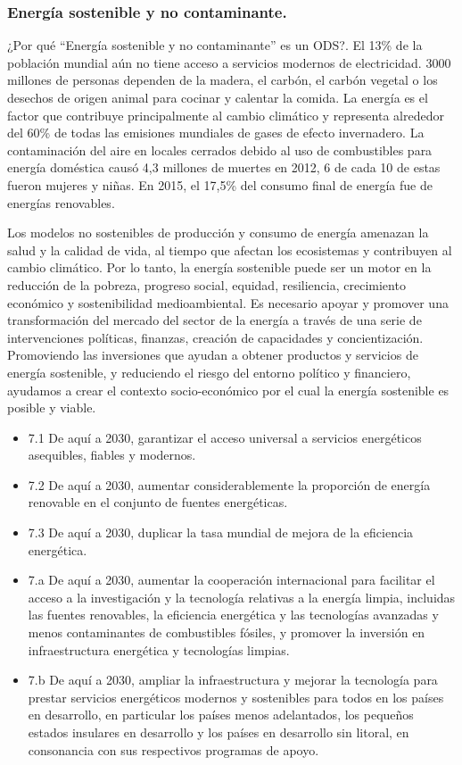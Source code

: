\subsubsection{Energía sostenible y no contaminante.}
¿Por qué ``Energía sostenible y no contaminante'' es un ODS?. El 13\% de la población mundial aún no tiene acceso a servicios modernos de electricidad. 3000 millones de personas dependen de la madera, el carbón, el carbón vegetal o los desechos de origen animal para cocinar y calentar la comida. La energía es el factor que contribuye principalmente al cambio climático y representa alrededor del 60\% de todas las emisiones mundiales de gases de efecto invernadero. La contaminación del aire en locales cerrados debido al uso de combustibles para energía doméstica causó 4,3 millones de muertes en 2012, 6 de cada 10 de estas fueron mujeres y niñas. En 2015, el 17,5\% del consumo final de energía fue de energías renovables.

Los modelos no sostenibles de producción y consumo de energía amenazan la salud y la calidad de vida, al tiempo que afectan los ecosistemas y contribuyen al cambio climático. Por lo tanto, la energía sostenible puede ser un motor en la reducción de la pobreza, progreso social, equidad, resiliencia, crecimiento económico y sostenibilidad medioambiental. Es necesario apoyar y promover una transformación del mercado del sector de la energía a través de una serie de intervenciones políticas, finanzas, creación de capacidades y concientización. Promoviendo las inversiones que ayudan a obtener productos y servicios de energía sostenible, y reduciendo el riesgo del entorno político y financiero, ayudamos a crear el contexto socio-económico por el cual la energía sostenible es posible y viable.

\begin{itemize}
    \item 7.1 De aquí a 2030, garantizar el acceso universal a servicios energéticos asequibles, fiables y modernos.
    \item 7.2 De aquí a 2030, aumentar considerablemente la proporción de energía renovable en el conjunto de fuentes energéticas.
    \item 7.3 De aquí a 2030, duplicar la tasa mundial de mejora de la eficiencia energética.
    \item 7.a De aquí a 2030, aumentar la cooperación internacional para facilitar el acceso a la investigación y la tecnología relativas a la energía limpia, incluidas las fuentes renovables, la eficiencia energética y las tecnologías avanzadas y menos contaminantes de combustibles fósiles, y promover la inversión en infraestructura energética y tecnologías limpias.
    \item 7.b De aquí a 2030, ampliar la infraestructura y mejorar la tecnología para prestar servicios energéticos modernos y sostenibles para todos en los países en desarrollo, en particular los países menos adelantados, los pequeños estados insulares en desarrollo y los países en desarrollo sin litoral, en consonancia con sus respectivos programas de apoyo.
\end{itemize}

